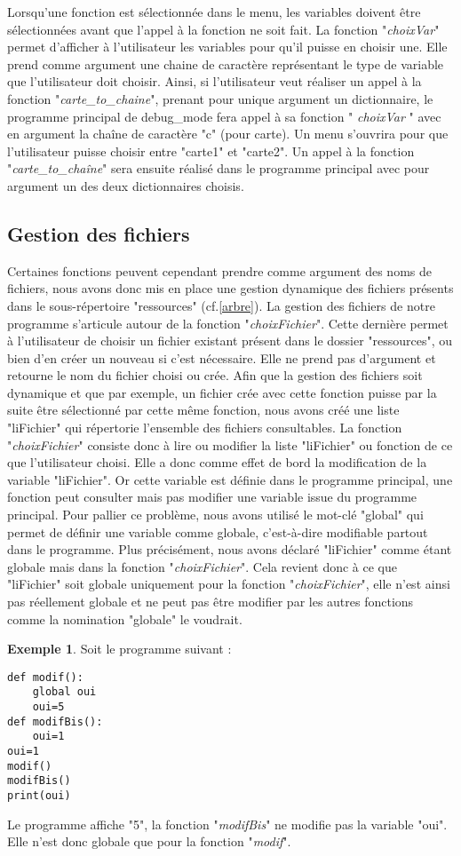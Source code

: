 \documentclass[10pt,a4paper,french,titlepage]{article}
\theoremstyle{definition}
\newtheorem{exmp}{Exemple}
\begin{document}
Lorsqu'une fonction est sélectionnée dans le menu, les variables doivent être sélectionnées avant que l'appel à la fonction ne soit fait. La fonction "\textit{choixVar}" permet d'afficher à l'utilisateur les variables pour qu'il puisse en choisir une. Elle prend comme argument une chaine de caractère représentant le type de variable que l'utilisateur doit choisir. Ainsi, si l'utilisateur veut réaliser un appel à la fonction "\textit{carte\_to\_chaine}", prenant pour unique argument un dictionnaire, le programme principal de debug\_mode fera appel à sa fonction " \textit{choixVar} " avec en argument la chaîne de caractère "c" (pour carte). Un menu s'ouvrira pour que l'utilisateur puisse choisir entre "carte1" et "carte2". Un appel à la fonction "\textit{carte\_to\_chaîne}" sera ensuite réalisé dans le programme principal avec pour argument un des deux dictionnaires choisis.


\subsection{Gestion des fichiers}
Certaines fonctions peuvent cependant prendre comme argument des noms de fichiers, nous avons donc mis en place une gestion dynamique des fichiers présents dans le sous-répertoire "ressources" (cf.\ref{arbre}). La gestion des fichiers de notre programme s'articule autour de la fonction "\textit{choixFichier}". Cette dernière permet à l'utilisateur de choisir un fichier existant présent dans le dossier "ressources", ou bien d'en créer un nouveau si c'est nécessaire. Elle ne prend pas d'argument et retourne le nom du fichier choisi ou crée. Afin que la gestion des fichiers soit dynamique et que par exemple, un fichier crée avec cette fonction puisse par la suite être sélectionné par cette même fonction, nous avons créé une liste "liFichier" qui répertorie l'ensemble des fichiers consultables. La fonction "\textit{choixFichier}" consiste donc à lire ou modifier la liste "liFichier" ou fonction de ce que l'utilisateur choisi. Elle a donc comme effet de bord la modification de la variable "liFichier". Or cette variable est définie dans le programme principal, une fonction peut consulter mais pas modifier une variable issue du programme principal. Pour pallier ce problème, nous avons utilisé le mot-clé "global" qui permet de définir une variable comme globale, c’est-à-dire modifiable partout dans le programme. Plus précisément, nous avons déclaré "liFichier" comme étant globale mais dans la fonction "\textit{choixFichier}". Cela revient donc à ce que "liFichier" soit globale uniquement pour la fonction "\textit{choixFichier}", elle n'est ainsi pas réellement globale et ne peut pas être modifier par les autres fonctions comme la nomination "globale" le voudrait.
\begin{exmp}
Soit le programme suivant :
\begin{lstlisting}
def modif():
    global oui
    oui=5
def modifBis():
    oui=1
oui=1
modif()
modifBis()
print(oui)
\end{lstlisting}
Le programme affiche "5", la fonction "\textit{modifBis}" ne modifie pas la variable "oui". Elle n'est donc globale que pour la fonction "\textit{modif}".
\end{exmp}
\end{document}
